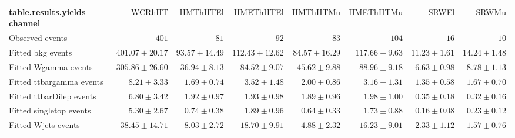 

\begin{table}
\begin{center}
\setlength{\tabcolsep}{0.0pc}
{\small
\begin{tabular*}{\textwidth}{@{\extracolsep{\fill}}lrrrrrrr}
\noalign{\smallskip}\hline\noalign{\smallskip}
{\bf table.results.yields channel}           & WCRhHT            & HMThHTEl            & HMEThHTEl            & HMThHTMu            & HMEThHTMu            & SRWEl            & SRWMu              \\[-0.05cm]
\noalign{\smallskip}\hline\noalign{\smallskip}
Observed events          & $401$              & $81$              & $92$              & $83$              & $104$              & $16$              & $10$                    \\
\noalign{\smallskip}\hline\noalign{\smallskip}
Fitted bkg events         & $401.07 \pm 20.17$          & $93.57 \pm 14.49$          & $112.43 \pm 12.62$          & $84.57 \pm 16.29$          & $117.66 \pm 9.63$          & $11.23 \pm 1.61$          & $14.24 \pm 1.48$              \\
\noalign{\smallskip}\hline\noalign{\smallskip}
        Fitted Wgamma events         & $305.86 \pm 26.60$          & $36.94 \pm 8.13$          & $84.52 \pm 9.07$          & $45.62 \pm 9.88$          & $88.96 \pm 9.18$          & $6.63 \pm 0.98$          & $8.78 \pm 1.13$              \\
        Fitted ttbargamma events         & $8.21 \pm 3.33$          & $1.69 \pm 0.74$          & $3.52 \pm 1.48$          & $2.00 \pm 0.86$          & $3.16 \pm 1.31$          & $1.35 \pm 0.58$          & $1.67 \pm 0.70$              \\
        Fitted ttbarDilep events         & $6.80 \pm 3.42$          & $1.92 \pm 0.97$          & $1.93 \pm 0.98$          & $1.89 \pm 0.96$          & $1.98 \pm 1.00$          & $0.35 \pm 0.18$          & $0.32 \pm 0.16$              \\
        Fitted singletop events         & $5.30 \pm 2.67$          & $0.74 \pm 0.38$          & $1.89 \pm 0.96$          & $0.64 \pm 0.33$          & $1.73 \pm 0.88$          & $0.16 \pm 0.08$          & $0.23 \pm 0.12$              \\
        Fitted Wjets events         & $38.45 \pm 14.71$          & $8.03 \pm 2.72$          & $18.70 \pm 9.91$          & $4.88 \pm 2.32$          & $16.23 \pm 9.01$          & $2.33 \pm 1.12$          & $1.57 \pm 0.76$              \\

\end{tabular*}}
\end{center}
\end{table}
